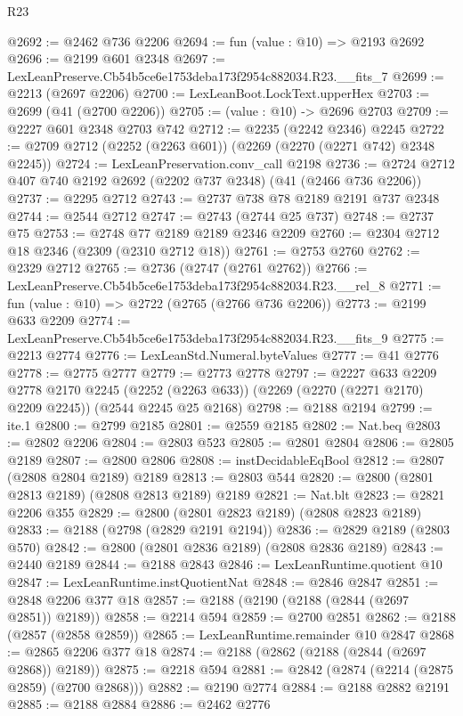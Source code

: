 \begin{lexlean}{R23}
\begin{coremodule}
@2692 := @2462 @736 @2206
@2694 := fun (value : @10) => @2193 @2692
@2696 := @2199 @601 @2348
@2697 := LexLeanPreserve.Cb54b5ce6e1753deba173f2954c882034.R23.__fits_7
@2699 := @2213 (@2697 @2206)
@2700 := LexLeanBoot.LockText.upperHex
@2703 := @2699 (@41 (@2700 @2206))
@2705 := (value : @10) -> @2696 @2703
@2709 := @2227 @601 @2348 @2703 @742
@2712 := @2235 (@2242 @2346) @2245
@2722 := @2709 @2712 (@2252 (@2263 @601)) (@2269 (@2270 (@2271 @742) @2348 @2245))
@2724 := LexLeanPreservation.conv_call @2198
@2736 := @2724 @2712 @407 @740 @2192 @2692 (@2202 @737 @2348) (@41 (@2466 @736 @2206))
@2737 := @2295 @2712
@2743 := @2737 @738 @78 @2189 @2191 @737 @2348
@2744 := @2544 @2712
@2747 := @2743 (@2744 @25 @737)
@2748 := @2737 @75
@2753 := @2748 @77 @2189 @2189 @2346 @2209
@2760 := @2304 @2712 @18 @2346 (@2309 (@2310 @2712 @18))
@2761 := @2753 @2760
@2762 := @2329 @2712
@2765 := @2736 (@2747 (@2761 @2762))
@2766 := LexLeanPreserve.Cb54b5ce6e1753deba173f2954c882034.R23.__rel_8
@2771 := fun (value : @10) => @2722 (@2765 (@2766 @736 @2206))
@2773 := @2199 @633 @2209
@2774 := LexLeanPreserve.Cb54b5ce6e1753deba173f2954c882034.R23.__fits_9
@2775 := @2213 @2774
@2776 := LexLeanStd.Numeral.byteValues
@2777 := @41 @2776
@2778 := @2775 @2777
@2779 := @2773 @2778
@2797 := @2227
    @633
    @2209
    @2778
    @2170
    @2245
    (@2252 (@2263 @633))
    (@2269 (@2270 (@2271 @2170) @2209 @2245))
    (@2544 @2245 @25 @2168)
@2798 := @2188 @2194
@2799 := ite.{1}
@2800 := @2799 @2185
@2801 := @2559 @2185
@2802 := Nat.beq
@2803 := @2802 @2206
@2804 := @2803 @523
@2805 := @2801 @2804
@2806 := @2805 @2189
@2807 := @2800 @2806
@2808 := instDecidableEqBool
@2812 := @2807 (@2808 @2804 @2189) @2189
@2813 := @2803 @544
@2820 := @2800 (@2801 @2813 @2189) (@2808 @2813 @2189) @2189
@2821 := Nat.blt
@2823 := @2821 @2206 @355
@2829 := @2800 (@2801 @2823 @2189) (@2808 @2823 @2189)
@2833 := @2188 (@2798 (@2829 @2191 @2194))
@2836 := @2829 @2189 (@2803 @570)
@2842 := @2800 (@2801 @2836 @2189) (@2808 @2836 @2189)
@2843 := @2440 @2189
@2844 := @2188 @2843
@2846 := LexLeanRuntime.quotient @10
@2847 := LexLeanRuntime.instQuotientNat
@2848 := @2846 @2847
@2851 := @2848 @2206 @377 @18
@2857 := @2188 (@2190 (@2188 (@2844 (@2697 @2851)) @2189))
@2858 := @2214 @594
@2859 := @2700 @2851
@2862 := @2188 (@2857 (@2858 @2859))
@2865 := LexLeanRuntime.remainder @10 @2847
@2868 := @2865 @2206 @377 @18
@2874 := @2188 (@2862 (@2188 (@2844 (@2697 @2868)) @2189))
@2875 := @2218 @594
@2881 := @2842 (@2874 (@2214 (@2875 @2859) (@2700 @2868)))
@2882 := @2190 @2774
@2884 := @2188 @2882 @2191
@2885 := @2188 @2884
@2886 := @2462 @2776

\end{coremodule}
\end{lexlean}
